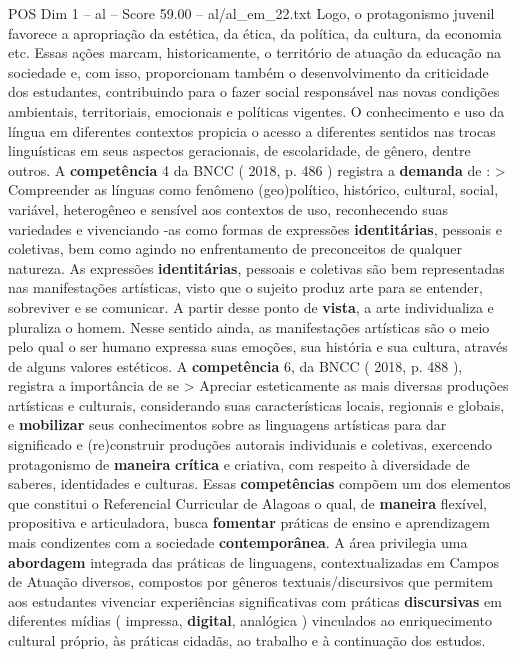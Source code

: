 \begin{textsample}{POS Dim 1 – al – Score 59.00 – al/al\_em\_22.txt}
Logo, o protagonismo juvenil favorece a apropriação da estética, da ética, da política, da cultura, da economia etc.
Essas ações marcam, historicamente, o território de atuação da educação na sociedade e, com isso, proporcionam também o desenvolvimento da criticidade dos estudantes, contribuindo para o fazer social responsável nas novas condições ambientais, territoriais, emocionais e políticas vigentes.
O conhecimento e uso da língua em diferentes contextos propicia o acesso a diferentes sentidos nas trocas linguísticas em seus aspectos geracionais, de escolaridade, de gênero, dentre outros.
A \textbf{competência} 4 da BNCC ( 2018, p. 486 ) registra a \textbf{demanda} de : > Compreender as línguas como fenômeno (geo)político, histórico, cultural, social, variável, heterogêneo e sensível aos contextos de uso, reconhecendo suas variedades e vivenciando -as como formas de expressões \textbf{identitárias}, pessoais e coletivas, bem como agindo no enfrentamento de preconceitos de qualquer natureza.
As expressões \textbf{identitárias}, pessoais e coletivas são bem representadas nas manifestações artísticas, visto que o sujeito produz arte para se entender, sobreviver e se comunicar.
A partir desse ponto de \textbf{vista}, a arte individualiza e pluraliza o homem.
Nesse sentido ainda, as manifestações artísticas são o meio pelo qual o ser humano expressa suas emoções, sua história e sua cultura, através de alguns valores estéticos.
A \textbf{competência} 6, da BNCC ( 2018, p. 488 ), registra a importância de se > Apreciar esteticamente as mais diversas produções artísticas e culturais, considerando suas características locais, regionais e globais, e \textbf{mobilizar} seus conhecimentos sobre as linguagens artísticas para dar significado e (re)construir produções autorais individuais e coletivas, exercendo protagonismo de \textbf{maneira} \textbf{crítica} e criativa, com respeito à diversidade de saberes, identidades e culturas.
Essas \textbf{competências} compõem um dos elementos que constitui o Referencial Curricular de Alagoas o qual, de \textbf{maneira} flexível, propositiva e articuladora, busca \textbf{fomentar} práticas de ensino e aprendizagem mais condizentes com a sociedade \textbf{contemporânea}.
A área privilegia uma \textbf{abordagem} integrada das práticas de linguagens, contextualizadas em Campos de Atuação diversos, compostos por gêneros textuais/discursivos que permitem aos estudantes vivenciar experiências significativas com práticas \textbf{discursivas} em diferentes mídias ( impressa, \textbf{digital}, analógica ) vinculados ao enriquecimento cultural próprio, às práticas cidadãs, ao trabalho e à continuação dos estudos.

\end{textsample}
